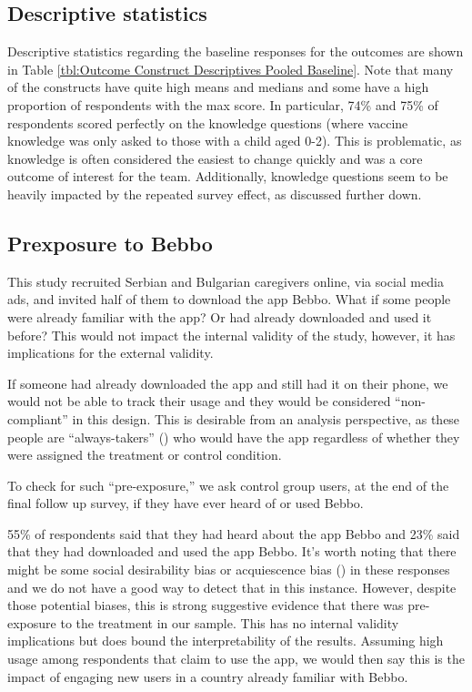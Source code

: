 

\subsection{Descriptive statistics}

Descriptive statistics regarding the baseline responses for the outcomes are shown in Table \ref{tbl:Outcome Construct Descriptives Pooled Baseline}. Note that many of the constructs have quite high means and medians and some have a high proportion of respondents with the max score. In particular, 74\% and 75\% of respondents scored perfectly on the knowledge questions (where vaccine knowledge was only asked to those with a child aged 0-2). This is problematic, as knowledge is often considered the easiest to change quickly and was a core outcome of interest for the team. Additionally, knowledge questions seem to be heavily impacted by the repeated survey effect, as discussed further down.



\subsection{Prexposure to Bebbo}

This study recruited Serbian and Bulgarian caregivers online, via social media ads, and invited half of them to download the app Bebbo. What if some people were already familiar with the app? Or had already downloaded and used it before? This would not impact the internal validity of the study, however, it has implications for the external validity.

If someone had already downloaded the app and still had it on their phone, we would not be able to track their usage and they would be considered “non-compliant” in this design. This is desirable from an analysis perspective, as these people are “always-takers” (\cite{Imbens2015}) who would have the app regardless of whether they were assigned the treatment or control condition.

To check for such “pre-exposure,” we ask control group users, at the end of the final follow up survey, if they have ever heard of or used Bebbo.

55\% of respondents said that they had heard about the app Bebbo and 23\% said that they had downloaded and used the app Bebbo. It’s worth noting that there might be some social desirability bias or acquiescence bias (\cite{Stantcheva2023}) in these responses and we do not have a good way to detect that in this instance. However, despite those potential biases, this is strong suggestive evidence that there was pre-exposure to the treatment in our sample. This has no internal validity implications but does bound the interpretability of the results. Assuming high usage among respondents that claim to use the app, we would then say this is the impact of engaging new users in a country already familiar with Bebbo.

